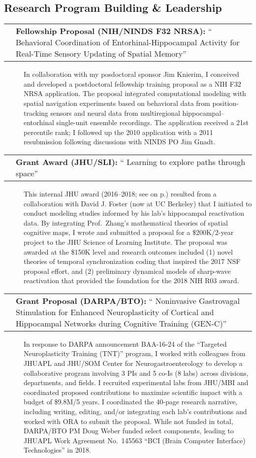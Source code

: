 \documentclass[10pt]{article}
\makeatletter
\newcommand{\unpubtitle}[1]{{\color{hopkinsblue} #1}}
\newcommand{\researchnote}[1]{
  \begin{description}
    \item[] {\hspace{2.2ex}\color{darkgray} #1}
  \end{description}
}
\newcommand{\researchactivity}[4]{
  \begin{minipage}[t]{\textwidth}
    \begin{tabular}{@{\hspace{2ex}}l>{\raggedright\arraybackslash}p{.8\textwidth}}
      \makebox[1.2in][l]{#1} & \textbf{#2:}
      ``\unpubtitle{#3}'' 
    \end{tabular}
  \researchnote{\hspace{1ex} #4}
  \end{minipage}
  \medbreak
}
\makeatother
\begin{document}
\subsection*{Research Program Building \& Leadership}
\label{sec:resprogram}

\researchactivity
{April 2010/2011}
{Fellowship Proposal (NIH/NINDS F32 NRSA)}
{Behavioral Coordination of Entorhinal-Hippocampal Activity for Real-Time
Sensory Updating of Spatial Memory}
{In collaboration with my posdoctoral sponsor Jim Knierim, I conceived and
  developed a postdoctoral fellowship training proposal as a NIH F32 NRSA
  application. The proposal integrated computational modeling with spatial
  navigation experiments based on behavioral data from position-tracking sensors
  and neural data from multiregional hippocampal--entorhinal single-unit ensemble
  recordings. The application received a 21st percentile rank; I followed up the
  2010 application with a 2011 resubmission following discussions with NINDS PO
Jim Gnadt.}
\label{sec:nrsa}

\researchactivity
{Mar. 2016--2018}
{Grant Award (JHU/SLI)}
{Learning to explore paths through space}
{This internal JHU award (2016--2018; see
  \emph{\nameref{sec:previnternalsupport}} on p.\pageref{sec:previnternalsupport})
  resulted from a collaboration with David J. Foster (now at UC Berkeley) that
  I initiated to conduct modeling studies informed by his lab’s hippocampal
  reactivation data. By integrating Prof.~Zhang’s mathematical theories of
  spatial cognitive maps, I wrote and submitted a proposal for a \$200K/2-year
  project to the JHU Science of Learning Institute. The proposal was awarded at
  the \$150K level and research outcomes included (1) novel theories of temporal
  synchronization coding that inspired the 2017 NSF proposal effort, and (2)
  preliminary dynamical models of sharp-wave reactivation that provided the
foundation for the 2018 NIH R03 award.}
\label{sec:sli}

\researchactivity
{April--June 2016}
{Grant Proposal (DARPA/BTO)}
{Noninvasive Gastrovagal Stimulation for Enhanced Neuroplasticity of Cortical
and Hippocampal Networks during Cognitive Training (GEN-C)}
{In response to DARPA announcement BAA-16-24 of the “Targeted Neuroplasticity
  Training (TNT)” program, I worked with colleagues from JHUAPL and JHU/SOM
  Center for Neurogastroenterology to develop a collaborative program involving 3
  PIs and 5 co-Is (8 labs) across divisions, departments, and fields. I recruited
  experimental labs from JHU/MBI and coordinated proposed contributions to
  maximize scientific impact with a budget of \$9.8M/5 years. I coordinated the
  40-page research narrative, including writing, editing, and/or integrating
  each lab’s contributions and worked with ORA to submit the proposal. While
  not funded in total, DARPA/BTO PM Doug Weber funded select components, leading
  to JHUAPL Work Agreement No.~145563 “BCI (Brain Computer Interface)
Technologies” in 2018.}
\label{sec:genc}
\end{document}
